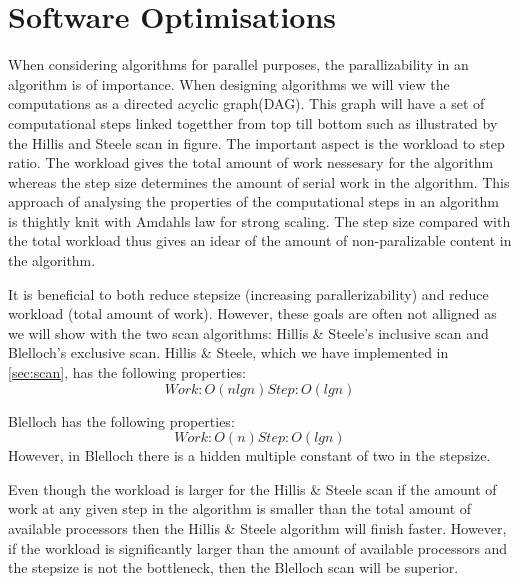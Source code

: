 \section{Software Optimisations}
\label{sec:software optimisations}
When considering algorithms for parallel purposes, the parallizability in an algorithm is of importance.
When designing algorithms we will view the computations as a directed acyclic graph(DAG).
This graph will have a set of computational steps linked togetther from top till bottom such as illustrated by the Hillis and Steele scan in figure. 
The important aspect is the workload to step ratio.
The workload gives the total amount of work nessesary for the algorithm whereas the step size determines the amount of serial work in the algorithm.
This approach of analysing the properties of the computational steps in an algorithm is thightly knit with Amdahls law for strong scaling.
The step size compared with the total workload thus gives an idear of the amount of non-paralizable content in the algorithm.

It is beneficial to both reduce stepsize (increasing parallerizability) and reduce workload (total amount of work).
However, these goals are often not alligned as we will show with the two scan algorithms: Hillis \& Steele's inclusive scan and Blelloch's exclusive scan.
Hillis \& Steele, which we have implemented in \cref{sec:scan}, has the following properties:
\begin{equation*}
Work: O(n lg n)
Step: O(lg n)
\end{equation*}

Blelloch has the following properties:
\begin{equation*}
Work: O(n)
Step: O(lg n)
\end{equation*}
However, in Blelloch there is a hidden multiple constant of two in the stepsize.

Even though the workload is larger for the Hillis \& Steele scan if the amount of work at any given step in the algorithm is smaller than the total amount of available processors then the Hillis \& Steele algorithm will finish faster.
However, if the workload is significantly larger than the amount of available processors and the stepsize is not the bottleneck, then the Blelloch scan will be superior.
